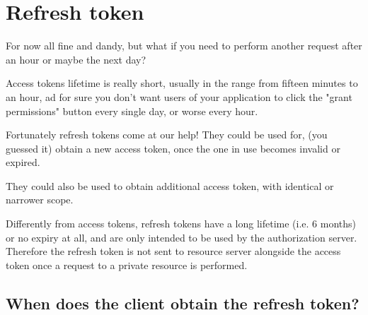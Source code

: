 \section{Refresh token}
For now all fine and dandy, but what if you need to perform
another request after an hour or maybe the next day?

Access tokens lifetime is really short, usually in the range from fifteen
minutes to an hour, ad for sure you don't want users of your application
to click the "grant permissions" button every single day, or worse every hour.

Fortunately refresh tokens come at our help!
They could be used for, (you guessed it) obtain a new access token, once the one
in use becomes invalid or expired.

They could also be used to obtain additional access token, with identical or
narrower scope.

Differently from access tokens, refresh tokens have a long lifetime (i.e. 6
months) or no expiry at all, and
are only intended to be used by the authorization
server.
\\
Therefore the refresh token is not sent to resource server alongside the access token
once a request to a private resource is performed.

\subsection{When does the client obtain the refresh token?}

